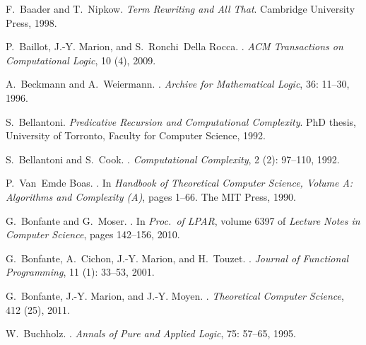 \documentclass{LMCS}
\begin{document}
\begin{thebibliography}{59}
F.~Baader and T.~Nipkow.
\newblock \emph{{Term Rewriting and All That}}.
\newblock Cambridge University Press, 1998.

P.~Baillot, J.-Y. Marion, and S.~Ronchi~Della Rocca.
.
\newblock \emph{ACM Transactions on Computational Logic}, 10 (4),
  2009.

A.~Beckmann and A.~Weiermann.
.
\newblock \emph{Archive for Mathematical Logic}, 36: 11--30, 1996.

S.~Bellantoni.
\newblock \emph{Predicative Recursion and Computational Complexity}.
\newblock PhD thesis, University of Torronto, Faculty for Computer Science,
  1992.

S.~Bellantoni and S.~Cook.
.
\newblock \emph{Computational Complexity}, 2 (2): 97--110,
  1992.

P.~Van~Emde Boas.
.
\newblock In \emph{Handbook of Theoretical Computer Science, Volume A:
  Algorithms and Complexity (A)}, pages 1--66. The MIT Press, 1990.

G.~Bonfante and G.~Moser.
.
\newblock In \emph{Proc.\ of  LPAR}, volume 6397 of \emph{Lecture Notes
  in Computer Science}, pages 142--156, 2010.

G.~Bonfante, A.~Cichon, J.-Y. Marion, and H.~Touzet.
.
\newblock \emph{Journal of Functional Programming}, 11 (1):
  33--53, 2001.

G.~Bonfante, J.-Y. Marion, and J.-Y. Moyen.
.
\newblock \emph{Theoretical Computer Science}, 412 (25), 2011.

W.~Buchholz.
.
\newblock \emph{Annals of Pure and Applied Logic}, 75: 57--65, 1995.


\end{thebibliography}
\end{document}
